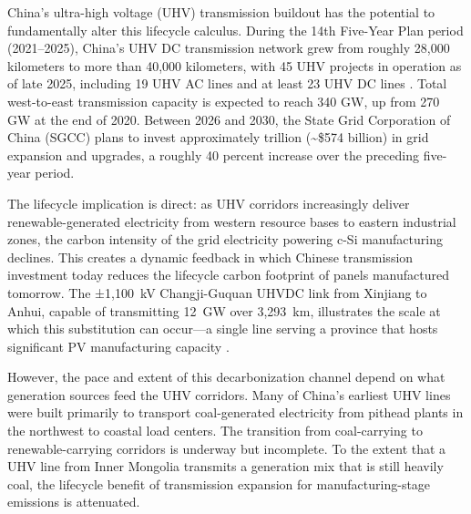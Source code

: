 \documentclass{article}
\begin{document}
China's ultra-high voltage (UHV) transmission buildout has the potential to fundamentally alter this lifecycle calculus. During the 14th Five-Year Plan period (2021--2025), China's UHV DC transmission network grew from roughly 28,000 kilometers to more than 40,000 kilometers, with 45 UHV projects in operation as of late 2025, including 19 UHV AC lines and at least 23 UHV DC lines \citep{golden2026chinatalk}. Total west-to-east transmission capacity is expected to reach 340 GW, up from 270 GW at the end of 2020. Between 2026 and 2030, the State Grid Corporation of China (SGCC) plans to invest approximately  trillion (\textasciitilde\$574 billion) in grid expansion and upgrades, a roughly 40 percent increase over the preceding five-year period.
 
The lifecycle implication is direct: as UHV corridors increasingly deliver renewable-generated electricity from western resource bases to eastern industrial zones, the carbon intensity of the grid electricity powering c-Si manufacturing declines. This creates a dynamic feedback in which Chinese transmission investment today reduces the lifecycle carbon footprint of panels manufactured tomorrow. The ±1,100~kV Changji-Guquan UHVDC link from Xinjiang to Anhui, capable of transmitting 12~GW over 3,293~km, illustrates the scale at which this substitution can occur---a single line serving a province that hosts significant PV manufacturing capacity \citep{fairley2019changji}.
 
However, the pace and extent of this decarbonization channel depend on what generation sources feed the UHV corridors. Many of China's earliest UHV lines were built primarily to transport coal-generated electricity from pithead plants in the northwest to coastal load centers. The transition from coal-carrying to renewable-carrying corridors is underway but incomplete. To the extent that a UHV line from Inner Mongolia transmits a generation mix that is still heavily coal, the lifecycle benefit of transmission expansion for manufacturing-stage emissions is attenuated.
 
 
 
\end{document}
